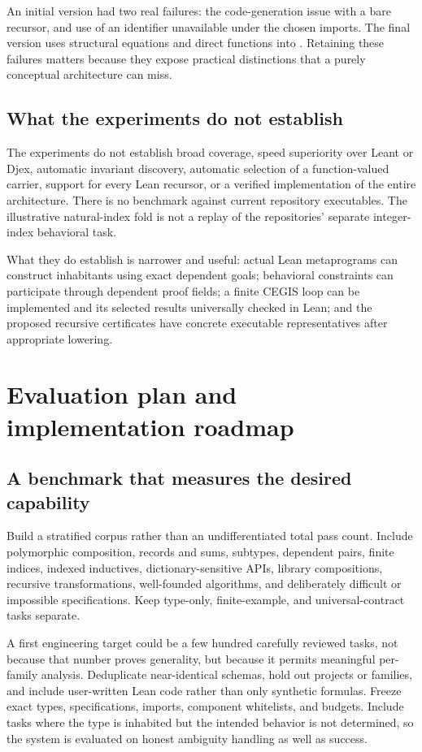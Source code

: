 \documentclass[11pt,letterpaper]{article}
\newcommand{\code}[1]{\texttt{\detokenize{#1}}}
\theoremstyle{definition}
\theoremstyle{remark}
\begin{document}
An initial version had two real failures: the code-generation issue with a bare recursor, and use of an \code{IsEmpty} identifier unavailable under the chosen imports. The final version uses structural equations and direct functions into \code{False}. Retaining these failures matters because they expose practical distinctions that a purely conceptual architecture can miss.

\subsection{What the experiments do not establish}

The experiments do not establish broad coverage, speed superiority over Leant or Djex, automatic invariant discovery, automatic selection of a function-valued carrier, support for every Lean recursor, or a verified implementation of the entire architecture. There is no benchmark against current repository executables. The illustrative natural-index fold is not a replay of the repositories' separate integer-index behavioral task.

What they do establish is narrower and useful: actual Lean metaprograms can construct inhabitants using exact dependent goals; behavioral constraints can participate through dependent proof fields; a finite CEGIS loop can be implemented and its selected results universally checked in Lean; and the proposed recursive certificates have concrete executable representatives after appropriate lowering.

\section{Evaluation plan and implementation roadmap}
\label{sec:roadmap}

\subsection{A benchmark that measures the desired capability}

Build a stratified corpus rather than an undifferentiated total pass count. Include polymorphic composition, records and sums, subtypes, dependent pairs, finite indices, indexed inductives, dictionary-sensitive APIs, library compositions, recursive transformations, well-founded algorithms, and deliberately difficult or impossible specifications. Keep type-only, finite-example, and universal-contract tasks separate.

A first engineering target could be a few hundred carefully reviewed tasks, not because that number proves generality, but because it permits meaningful per-family analysis. Deduplicate near-identical schemas, hold out projects or families, and include user-written Lean code rather than only synthetic formulas. Freeze exact types, specifications, imports, component whitelists, and budgets. Include tasks where the type is inhabited but the intended behavior is not determined, so the system is evaluated on honest ambiguity handling as well as success.
\end{document}
